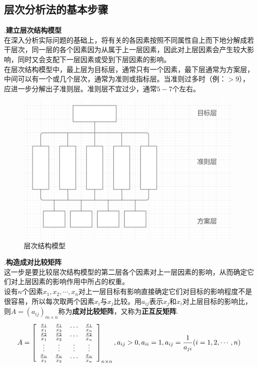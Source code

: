 \documentclass[openany]{progbookcn}
\begin{document}
\subsection{层次分析法的基本步骤}
.{\bf 建立层次结构模型}\\
\indent 在深入分析实际问题的基础上，将有关的各因素按照不同属性自上而下地分解成若干层次，同一层的各个因素因为从属于上一层因素，因此对上层因素会产生较大影响，同时又会支配下一层因素或受到下层因素的影响。\\
\indent 在层次结构模型中，最上层为目标层，通常只有一个因素，最下层通常为方案层，中间可以有一个或几个层次，通常为准则或指标层。当准则过多时（例：$>9$），应进一步分解出子准则层。准则层不宜过少，通常$5-7$个左右。
\begin{figure}[H]
\centering
\includegraphics[width=0.6 \textwidth]{figs/chapter3/层次分析结构}
\caption{层次结构模型}
\end{figure}
.{\bf 构造成对比较矩阵}\\
\indent 这一步是要比较层次结构模型的第二层各个因素对上一层因素的影响，从而确定它们对上层因素的影响作用中所占的权重。\\
\indent 设有$n$个因素$x_1,x_2,\cdots,x_n$对上一层目标有影响直接确定它们对目标的影响程度不是很容易，所以每次取两个因素$x_i$与$x_j$比较。用$a_{ij}$表示$x_j$和$x_i$对上层目标的影响比，则$A=(a_{ij})_{m\times n}$称为{\bf 成对比较矩阵}，又称为{\bf 正互反矩阵}.
\begin{equation}
A = \left[ {\begin{array}{*{20}{c}}
{\frac{{{x_{\rm{1}}}}}{{{x_1}}}}&{\frac{{{x_1}}}{{{x_2}}}}& \cdots &{\frac{{{x_1}}}{{{x_n}}}}\\
{\frac{{{x_2}}}{{{x_1}}}}&{\frac{{{x_2}}}{{{x_2}}}}& \cdots &{\frac{{{x_2}}}{{{x_n}}}}\\
 \vdots & \vdots & \vdots & \vdots \\
{\frac{{{x_n}}}{{{x_1}}}}&{\frac{{{x_n}}}{{{x_2}}}}& \cdots &{\frac{{{x_n}}}{{{x_n}}}}
\end{array}} \right]_{n\times n},{a_{ij}} > 0,{a_{ii}} = 1,{a_{ij}} = \frac{1}{{{a_{ji}}}}(i = 1,2, \cdots ,n)
\end{equation}
\end{document}
